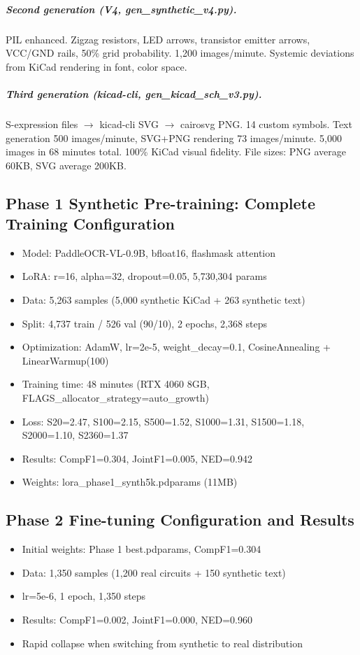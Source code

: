 \subparagraph{Second generation (V4, gen\_synthetic\_v4.py).} PIL enhanced. Zigzag resistors, LED arrows, transistor emitter arrows, VCC/GND rails, 50\% grid probability. 1,200 images/minute. Systemic deviations from KiCad rendering in font, color space.

\subparagraph{Third generation (kicad-cli, gen\_kicad\_sch\_v3.py).} S-expression files $\to$ kicad-cli SVG $\to$ cairosvg PNG. 14 custom symbols. Text generation 500 images/minute, SVG+PNG rendering 73 images/minute. 5,000 images in 68 minutes total. 100\% KiCad visual fidelity. File sizes: PNG average 60KB, SVG average 200KB.

\subsection{Phase 1 Synthetic Pre-training: Complete Training Configuration}

\begin{itemize}[nosep]
    \item Model: PaddleOCR-VL-0.9B, bfloat16, flashmask attention
    \item LoRA: r=16, alpha=32, dropout=0.05, 5,730,304 params
    \item Data: 5,263 samples (5,000 synthetic KiCad + 263 synthetic text)
    \item Split: 4,737 train / 526 val (90/10), 2 epochs, 2,368 steps
    \item Optimization: AdamW, lr=2e-5, weight\_decay=0.1, CosineAnnealing + LinearWarmup(100)
    \item Training time: 48 minutes (RTX 4060 8GB, FLAGS\_allocator\_strategy=auto\_growth)
    \item Loss: S20=2.47, S100=2.15, S500=1.52, S1000=1.31, S1500=1.18, S2000=1.10, S2360=1.37
    \item Results: CompF1=0.304, JointF1=0.005, NED=0.942
    \item Weights: lora\_phase1\_synth5k.pdparams (11MB)
\end{itemize}

\subsection{Phase 2 Fine-tuning Configuration and Results}

\begin{itemize}[nosep]
    \item Initial weights: Phase 1 best.pdparams, CompF1=0.304
    \item Data: 1,350 samples (1,200 real circuits + 150 synthetic text)
    \item lr=5e-6, 1 epoch, 1,350 steps
    \item Results: CompF1=0.002, JointF1=0.000, NED=0.960
    \item Rapid collapse when switching from synthetic to real distribution
\end{itemize}

